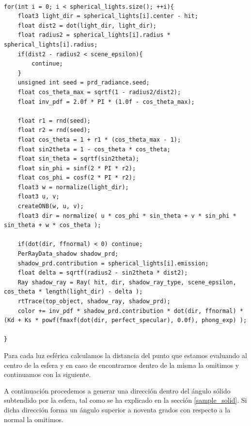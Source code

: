 \begin{lstlisting}

for(int i = 0; i < spherical_lights.size(); ++i){
	float3 light_dir = spherical_lights[i].center - hit;
	float dist2 = dot(light_dir, light_dir);
	float radius2 = spherical_lights[i].radius * spherical_lights[i].radius;
	if(dist2 - radius2 < scene_epsilon){
		continue;
	}
	unsigned int seed = prd_radiance.seed;
	float cos_theta_max = sqrtf(1 - radius2/dist2);
	float inv_pdf = 2.0f * PI * (1.0f - cos_theta_max);
	
	float r1 = rnd(seed);
	float r2 = rnd(seed);
	float cos_theta = 1 + r1 * (cos_theta_max - 1);
	float sin2theta = 1 - cos_theta * cos_theta;
	float sin_theta = sqrtf(sin2theta);
	float sin_phi = sinf(2 * PI * r2);
	float cos_phi = cosf(2 * PI * r2);
	float3 w = normalize(light_dir);
	float3 u, v;
	createONB(w, u, v);
	float3 dir = normalize( u * cos_phi * sin_theta + v * sin_phi * sin_theta + w * cos_theta );

	if(dot(dir, ffnormal) < 0) continue;
	PerRayData_shadow shadow_prd;
	shadow_prd.contribution = spherical_lights[i].emission;
	float delta = sqrtf(radius2 - sin2theta * dist2);
	Ray shadow_ray = Ray( hit, dir, shadow_ray_type, scene_epsilon, cos_theta * length(light_dir) - delta );
	rtTrace(top_object, shadow_ray, shadow_prd);
	color += inv_pdf * shadow_prd.contribution * dot(dir, ffnormal) * (Kd + Ks * powf(fmaxf(dot(dir, perfect_specular), 0.0f), phong_exp) );

}
\end{lstlisting}

Para cada luz esférica calculamos la distancia del punto que estamos evaluando al centro de la esfera y en caso de encontrarnos dentro de la misma la omitimos y continuamos con la siguiente.

\medskip


A continuación procedemos a generar una dirección dentro del ángulo sólido subtendido por la esfera, tal como se ha explicado en la sección \ref{sample_solid}. Si dicha dirección forma un ángulo superior a noventa grados con respecto a la normal la omitimos.

